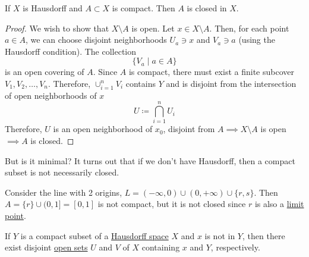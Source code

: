   \begin{theorem}
    \label{thm:compact-subsets-of-hausdorff-spaces-are-closed}
    If $X$ is Hausdorff and $A \subset X$ is compact. Then $A$ is closed in $X$. 
  \end{theorem}
  \begin{proof}
    We wish to show that $X \setminus A$ is open. Let $x \in X \setminus A$. Then, for each point $a \in A$, we can choose disjoint neighborhoods $U_a \ni x$ and $V_a \ni a$ (using the Hausdorff condition). The collection 
    \begin{equation}
      \{V_a \mid a \in A\}
    \end{equation}
    is an open covering of $A$. Since $A$ is compact, there must exist a finite subcover $V_1, V_2, \ldots , V_n$. Therefore, $\cup_{i=1}^{n} V_i$ contains $Y$ and is disjoint from the intersection of open neighborhoods of $x$
    \begin{equation}
      U \coloneqq \bigcap_{i=1}^n U_i
    \end{equation}
    Therefore, $U$ is an open neighborhood of $x_0$, disjoint from $A \implies X \setminus A$ is open $\implies A$ is closed.
  \end{proof}

  But is it minimal? It turns out that if we don't have Hausdorff, then a compact subset is not necessarily closed. 

  \begin{example}
    \label{ex:line-with-2-origins}
    Consider the line with 2 origins, $L = (-\infty, 0) \cup (0, +\infty) \cup \{r, s\}$. Then $A = \{r\} \cup (0, 1] = [0, 1]$ is not compact, but it is not closed since $r$ is also a \hyperref[def:limit-point]{limit point}. 
  \end{example}

  \begin{lemma}
    \label{thm:compact-subsets-and-points-can-be-separated-in}
    If $Y$ is a compact subset of a \hyperref[def:hausdorff-space]{Hausdorff space} $X$ and $x$ is not in $Y$, then there exist disjoint \hyperref[def:open-set]{open sets} $U$ and $V$ of $X$ containing $x$ and $Y$, respectively. 

    \begin{figure}[H]
      \centering 
      \label{fig:hausdorff_compact}
    \end{figure}
  \end{lemma}

